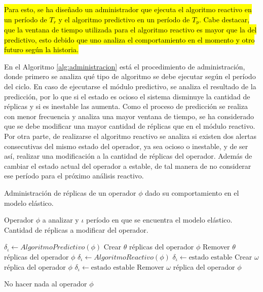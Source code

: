 \hl{Para esto, se ha diseñado un administrador que ejecuta el algoritmo reactivo en un período de $T_r$ y el algoritmo predictivo en un período de $T_p$. Cabe destacar, que la ventana de tiempo utilizada para el algoritmo reactivo es mayor que la del predictivo, esto debido que uno analiza el comportamiento en el momento y otro futuro según la historia.}

En el Algoritmo \ref{alg:administracion} está el procedimiento de administración, donde primero se analiza qué tipo de algoritmo se debe ejecutar según el período del ciclo. En caso de ejecutarse el módulo predictivo, se analiza el resultado de la predicción, por lo que si el estado es ocioso el sistema disminuye la cantidad de réplicas y si es inestable las aumenta. Como el proceso de predicción se realiza con menor frecuencia y analiza una mayor ventana de tiempo, se ha considerado que se debe modificar una mayor cantidad de réplicas que en el módulo reactivo. Por otra parte, de realizarse el algoritmo reactivo se analiza si existen dos alertas consecutivas del mismo estado del operador, ya sea ocioso o inestable, y de ser así, realizar una modificación a la cantidad de réplicas del operador. Además de cambiar el estado actual del operador a estable, de tal manera de no considerar ese período para el próximo análisis reactivo.

\begin{algorithm}[!ht]
	\caption{Administración de réplicas de un operador $\phi$ dado su comportamiento en el modelo elástico.}
	\label{alg:administracion}
	\begin{algorithmic}[1]
	\REQUIRE Operador $\phi$ a analizar y $\iota$ período en que se encuentra el modelo elástico.
	\ENSURE Cantidad de réplicas a modificar del operador.	
	
		\STATE $\delta_{\iota} \leftarrow AlgoritmoPredictivo(\phi)$
				\RETURN Crear $\theta$ réplicas del operador $\phi$
			\ENDIF
			\RETURN Remover $\theta$ réplicas del operador $\phi$
		\ENDIF
	\ELSE[$\iota$ es $T_r$]
		\STATE $\delta_{\iota} \leftarrow AlgoritmoReactivo(\phi)$
				\STATE $\delta_{\iota} \leftarrow \text{estado estable}$ 
				\RETURN Crear $\omega$ réplica del operador $\phi$
			\ENDIF
			\STATE $\delta_{\iota} \leftarrow \text{estado estable}$ 
			\RETURN Remover $\omega$ réplica del operador $\phi$
		\ENDIF 
	\ENDIF
	
	\RETURN No hacer nada al operador $\phi$
	
	\end{algorithmic}
\end{algorithm}

